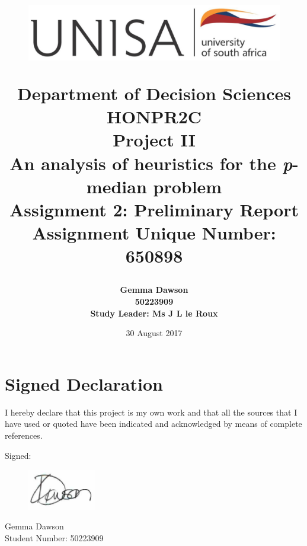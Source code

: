 \documentclass[11pt]{article}
\newcommand{\np}{\newpage}
\begin{document}
	\title{
		\begin{figure}[!htb]
			\begin{center}
				\includegraphics[width=12cm]{unisa.png}
			\end{center}
		\end{figure}
		Department of Decision Sciences\\[3mm]
		HONPR2C\\
		Project II \\[2cm]		
		{\Huge \textbf{An analysis of heuristics for the \emph{p}-median problem}}\\[15mm]
		Assignment 2: Preliminary Report\\[3mm]
		Assignment Unique Number: 650898\\[2cm]
	}
	\author{\textbf{\Large Gemma Dawson}\\[3mm]
		\textbf{\Large 50223909}\\[3mm]
		\textbf{Study Leader: Ms J L le Roux}
	}
	\date{\Large 30 August 2017}	
	\maketitle
	\thispagestyle{empty}
	\np
	
	\section*{Signed Declaration}
	I hereby declare that this project is my own work and that all the sources that I have used or quoted have been indicated and acknowledged by means of complete references.
	
	Signed:
	\begin{figure}[!htb]
			\includegraphics[width=3cm]{signature.png}
	\end{figure}

	Gemma Dawson\\
	Student Number: 50223909\\
	
	
	\thispagestyle{empty}
	\np
	
\end{document}
